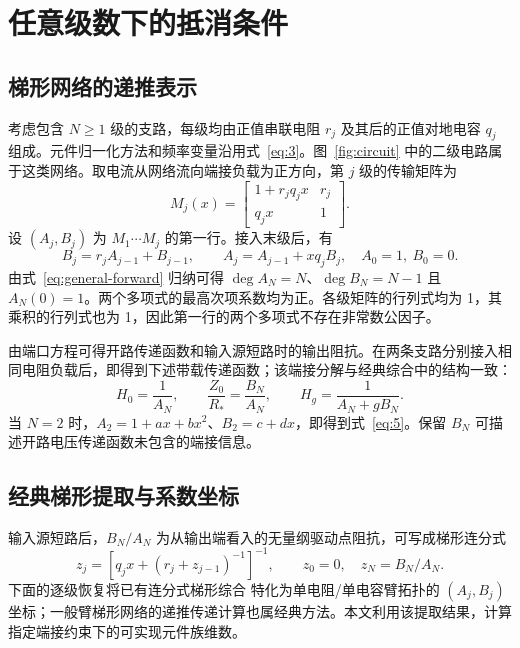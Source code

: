 \section{任意级数下的抵消条件}
\label{sec:general-order}

\subsection{梯形网络的递推表示}

考虑包含 $N\geq1$ 级的支路，每级均由正值串联电阻 $r_j$ 及其后的正值对地电容 $q_j$ 组成。元件归一化方法和频率变量沿用式~\eqref{eq:3}。图~\ref{fig:circuit} 中的二级电路属于这类网络。取电流从网络流向端接负载为正方向，第 $j$ 级的传输矩阵为
\begin{equation}\label{eq:general-matrix}
M_j(x)=\begin{bmatrix}1+r_jq_jx&r_j\\q_jx&1\end{bmatrix}.
\end{equation}
设 $(A_j,B_j)$ 为 $M_1\cdots M_j$ 的第一行。接入末级后，有
\begin{equation}\label{eq:general-forward}
B_j=r_jA_{j-1}+B_{j-1},\qquad
A_j=A_{j-1}+xq_jB_j,
\quad A_0=1,\ B_0=0.
\end{equation}
由式~\eqref{eq:general-forward} 归纳可得 $\deg A_N=N$、$\deg B_N=N-1$ 且 $A_N(0)=1$。两个多项式的最高次项系数均为正。各级矩阵的行列式均为 1，其乘积的行列式也为 1，因此第一行的两个多项式不存在非常数公因子。

由端口方程可得开路传递函数和输入源短路时的输出阻抗。在两条支路分别接入相同电阻负载后，即得到下述带载传递函数；该端接分解与经典综合中的结构一致\citep{guillemin1949rcsynthesis}：
\begin{equation}\label{eq:general-transfer}
H_0=\frac1{A_N},\qquad
\frac{Z_0}{R_*}=\frac{B_N}{A_N},\qquad
H_g=\frac1{A_N+gB_N}.
\end{equation}
当 $N=2$ 时，$A_2=1+ax+bx^2$、$B_2=c+dx$，即得到式~\eqref{eq:5}。保留 $B_N$ 可描述开路电压传递函数未包含的端接信息。

\subsection{经典梯形提取与系数坐标}

输入源短路后，$B_N/A_N$ 为从输出端看入的无量纲驱动点阻抗，可写成梯形连分式\citep{guillemin1949rcsynthesis,lee1978chain}
\[
z_j=\left[q_jx+\left(r_j+z_{j-1}\right)^{-1}\right]^{-1},
\qquad z_0=0,\quad z_N=B_N/A_N.
\]
下面的逐级恢复将已有连分式梯形综合\citep{guillemin1949rcsynthesis,lee1978chain} 特化为单电阻/单电容臂拓扑的 $(A_j,B_j)$ 坐标；一般臂梯形网络的递推传递计算也属经典方法\citep{fialkow1951rcladder}。本文利用该提取结果，计算指定端接约束下的可实现元件族维数。

